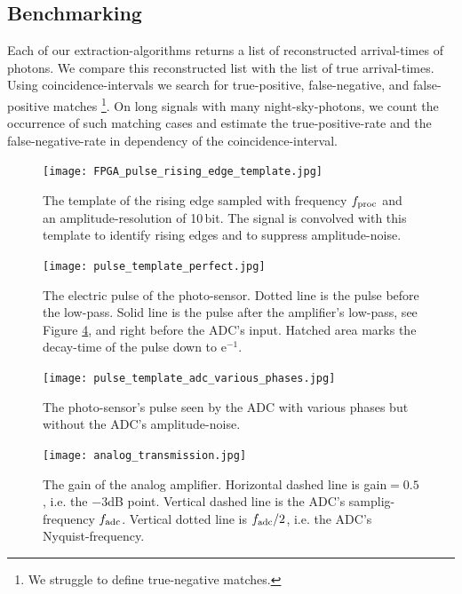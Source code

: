 \documentclass{article}%
\begin{document}
\begin{multicols}{2}
\subsection*{Benchmarking}%
%
Each of our extraction-algorithms returns a list of reconstructed arrival-times of photons.
%
We compare this reconstructed list with the list of true arrival-times.
%
Using coincidence-intervals we search for true-positive, false-negative, and false-positive matches \footnote{We struggle to define true-negative matches.}.
%
On long signals with many night-sky-photons, we count the occurrence of such matching cases and estimate the true-positive-rate and the false-negative-rate in dependency of the coincidence-interval.
%
\begin{figure}[H]%
\centering%
\texttt{[image: FPGA\_pulse\_rising\_edge\_template.jpg]}%
\caption{
The template of the rising edge sampled with frequency $f_\text{proc}{}$ and an amplitude-resolution of 10\,bit. The signal is convolved with this template to identify rising edges and to suppress amplitude-noise.
}%
\label{FigSimRisingEdgeTemplate}
\end{figure}
%
\begin{figure}[H]%
\centering%
\texttt{[image: pulse\_template\_perfect.jpg]}%
\caption{
The electric pulse of the photo-sensor.
%
Dotted line is the pulse before the low-pass.
%
Solid line is the pulse after the amplifier's low-pass, see Figure \ref{FigSimAnalogTransmission}, and right before the ADC's input.
%
Hatched area marks the decay-time of the pulse down to $\mathrm{e}^{-1}$.
}%
\label{FigSimPulseTemplate}
\end{figure}
%
\begin{figure}[H]%
\centering%
\texttt{[image: pulse\_template\_adc\_various\_phases.jpg]}%
\caption{
The photo-sensor's pulse seen by the ADC with various phases but without the ADC's amplitude-noise.
}%
\label{FigSimPulsePhases}
\end{figure}
%
\begin{figure}[H]%
\centering%
\texttt{[image: analog\_transmission.jpg]}%
\caption{
The gain of the analog amplifier.
%
Horizontal dashed line is gain$=0.5$, i.e. the $-3$dB point.
%
Vertical dashed line is the ADC's samplig-frequency $f_\text{adc}{}$.
%
Vertical dotted line is $f_\text{adc}{}/2$, i.e. the ADC's Nyquist-frequency.
}%
\label{FigSimAnalogTransmission}
\end{figure}
%

\end{multicols}
\end{document}
